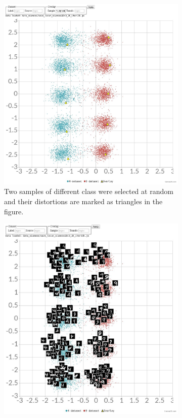 \documentclass[a4paper,12pt]{report}
\begin{document}
\begin{figure}[h]
    \centering
    \begin{subfigure}{0.7\textwidth}
        \centering
        \includegraphics{thesis_figures/mnist_cl2d.jpg}
        \caption{Two samples of different class were selected at random and their distortions are marked as triangles in the figure.}
    \end{subfigure}
    \begin{subfigure}{0.7\textwidth}
        \centering
        \includegraphics{thesis_figures/mnist_cl2d2.jpg}

\end{subfigure}
\end{figure}
\end{document}

